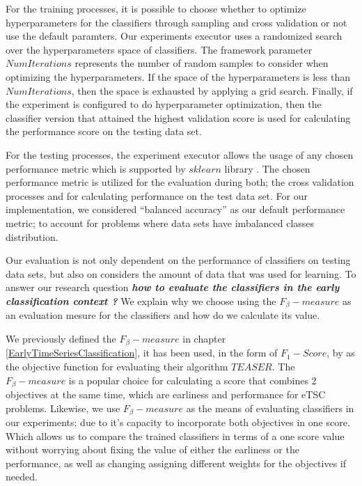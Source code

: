 For the training processes, it is possible to choose whether to optimize hyperparameters for the classifiers through sampling and cross validation or not use the default paramters.
Our experiments executor uses a randomized search over the hyperparameters space of classifiers.
The framework parameter $NumIterations$ represents the number of random samples to consider when optimizing the hyperparameters.
If the space of the hyperparameters is less than $NumIterations$, then the space is exhausted by applying a grid search.
Finally, if the experiment is configured to do hyperparameter optimization,
then the classifier version that attained the highest validation score is used for calculating the performance score on the testing data set.

For the testing processes, the experiment executor allows the usage of any chosen performance metric which is supported by $sklearn$ library \cite{scikit-learn}.
The chosen performance metric is utilized for the evaluation during both; the cross validation processes and for calculating performance on the test data set.
For our implementation, we considered \enquote{balanced accuracy} as our default performance metric; to account for problems where data sets have imbalanced classes distribution.

Our evaluation is not only dependent on the performance of classifiers on testing data sets, but also on considers the amount of data that was used for learning.
To answer our research question \textbf{\textit{how to evaluate the classifiers in the early classification context ?}}
We explain why we choose using the $F_{\beta}-measure$ as an evaluation mesure for the classifiers and how do we calculate its value.

We previously defined the $F_{\beta}-measure$ in chapter \ref{EarlyTimeSeriesClassification}, it has been used, in the form of $F_{1}-Score$, by \cite{schafer2020teaser} as the objective function for evaluating their algorithm $TEASER$.
The $F_{\beta}-measure$ is a popular choice for calculating a score that combines 2 objectives at the same time, which are earliness and performance for eTSC problems.
Likewise, we use $F_{\beta}-measure$ as the means of evaluating classifiers in our experiments; due to it's capacity to incorporate both objectives in one score.
Which allows us to compare the trained classifiers in terms of a one score value without worrying about fixing the value of either the earliness or the performance,
as well as changing assigning different weights for the objectives if needed.

